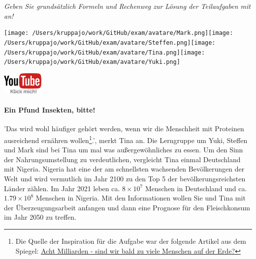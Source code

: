 \documentclass[a4paper, 9pt]{scrartcl}\usepackage[]{graphicx}\usepackage[]{xcolor}
\begin{document}
\textit{Geben Sie grundsätzlich Formeln und Rechenweg zur Lösung der Teilaufgaben mit an!} \\[1Ex]
 

 
\ifcollection
\begin{flushright}
\tiny\vspace{-3Ex}
\textbf{\examinhaltstart}
\exammodulemathstat
\vspace{-4Ex}
\end{flushright}
\begin{minipage}[t]{0.5\textwidth}
\texttt{[image: /Users/kruppajo/work/GitHub/exam/avatare/Mark.png]}\hspace{-4mm}\texttt{[image: /Users/kruppajo/work/GitHub/exam/avatare/Steffen.png]}\hspace{-4mm}\texttt{[image: /Users/kruppajo/work/GitHub/exam/avatare/Tina.png]}\hspace{-4mm}\texttt{[image: /Users/kruppajo/work/GitHub/exam/avatare/Yuki.png]}
\end{minipage}
\begin{minipage}[t]{0.5\textwidth}
\hfill
\href{https://youtu.be/OhyuH6hzEhY}{\includegraphics[width = 2cm]{img/youtube}}
\end{minipage}
\fi







\ifcollection
\paragraph{Ein Pfund Insekten, bitte!} 
\fi

'Das wird wohl häufiger gehört werden, wenn wir die Menschheit mit Proteinen ausreichend ernähren wollen\footnote{Die Quelle der Inspiration für die Aufgabe war der folgende Artikel aus dem Spiegel: \href{https://www.spiegel.de/ausland/ueberbevoelkerung-acht-milliarden-sind-wir-bald-zu-viele-menschen-auf-der-erde-a-3f20c7bc-3d60-4440-9f52-eb338db207f5}{Acht Milliarden - sind wir bald zu viele Menschen auf der Erde?}}.', merkt Tina an. Die Lerngruppe um Yuki, Steffen und Mark sind bei Tina um mal was außergewöhnliches zu essen. Um den Sinn der Nahrungsumstellung zu verdeutlichen, vergleicht Tina einmal Deutschland mit Nigeria. Nigeria hat eine der am schnellsten wachsenden Bevölkerungen der Welt und wird vermutlich im Jahr 2100 zu den Top 5 der bevölkerungsreichsten Länder zählen. Im Jahr 2021 leben ca. \ensuremath{8\times 10^{7}} Menschen in Deutschland und ca. \ensuremath{1.79\times 10^{8}} Menschen in Nigeria. Mit den Informationen wollen Sie und Tina mit der Überzeugungsarbeit anfangen und dann eine Prognose für den Fleischkonsum im Jahr 2050 zu treffen. \\ 
\end{document}
